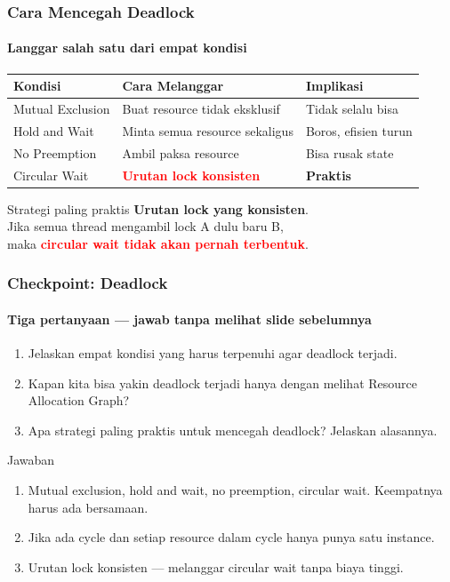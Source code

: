 \documentclass[t,aspectratio=169,xcolor=dvipsnames]{beamer}
\newcommand{\tem}[1]{\textbf{\textcolor{red}{#1}}}
\begin{document}
\begin{frame}
    \frametitle{Cara Mencegah Deadlock}
    \framesubtitle{Langgar salah satu dari empat kondisi}
    \small

    \begin{tabular}{p{2.2cm} p{3.5cm} p{2.8cm}}
        \textbf{Kondisi} & \textbf{Cara Melanggar} & \textbf{Implikasi} \\
        \hline
        Mutual Exclusion & Buat resource tidak eksklusif & Tidak selalu bisa \\
        Hold and Wait & Minta semua resource sekaligus & Boros, efisien turun \\
        No Preemption & Ambil paksa resource & Bisa rusak state \\
        Circular Wait & \tem{Urutan lock konsisten} & \textbf{Praktis} \\
    \end{tabular}

    \vspace{1em}
    \begin{alertblock}{Strategi paling praktis}
        \centering
        \textbf{Urutan lock yang konsisten}.\\
        Jika semua thread mengambil lock A dulu baru B,\\
        maka \tem{circular wait tidak akan pernah terbentuk}.
    \end{alertblock}
\end{frame}

\begin{frame}[shrink=10]
    \frametitle{Checkpoint: Deadlock}
    \framesubtitle{Tiga pertanyaan — jawab tanpa melihat slide sebelumnya}
    \small

    \begin{enumerate}
        \item Jelaskan empat kondisi yang harus terpenuhi agar deadlock terjadi.
        \item Kapan kita bisa yakin deadlock terjadi hanya dengan melihat Resource Allocation Graph?
        \item Apa strategi paling praktis untuk mencegah deadlock? Jelaskan alasannya.
    \end{enumerate}

    \begin{block}{Jawaban}
        \footnotesize
        \begin{enumerate}
            \item Mutual exclusion, hold and wait, no preemption, circular wait. Keempatnya harus ada bersamaan.
            \item Jika ada cycle dan setiap resource dalam cycle hanya punya satu instance.
            \item Urutan lock konsisten — melanggar circular wait tanpa biaya tinggi.
        \end{enumerate}
    \end{block}
\end{frame}
\end{document}
